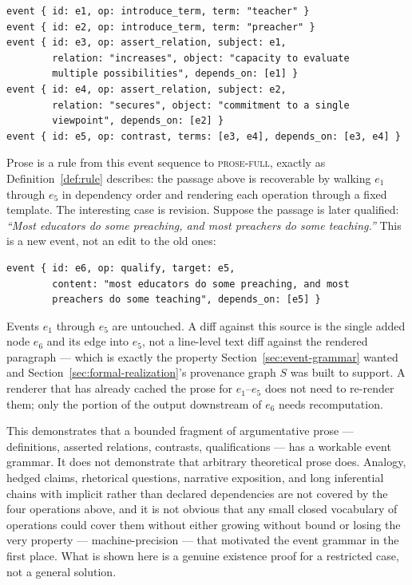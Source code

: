 \documentclass[11pt]{article}
\theoremstyle{definition}
\begin{document}
\begin{verbatim}
event { id: e1, op: introduce_term, term: "teacher" }
event { id: e2, op: introduce_term, term: "preacher" }
event { id: e3, op: assert_relation, subject: e1,
        relation: "increases", object: "capacity to evaluate
        multiple possibilities", depends_on: [e1] }
event { id: e4, op: assert_relation, subject: e2,
        relation: "secures", object: "commitment to a single
        viewpoint", depends_on: [e2] }
event { id: e5, op: contrast, terms: [e3, e4], depends_on: [e3, e4] }
\end{verbatim}

Prose is a rule from this event sequence to \textsc{prose-full}, exactly as Definition~\ref{def:rule} describes: the passage above is recoverable by walking $e_1$ through $e_5$ in dependency order and rendering each operation through a fixed template. The interesting case is revision. Suppose the passage is later qualified: \emph{``Most educators do some preaching, and most preachers do some teaching.''} This is a new event, not an edit to the old ones:

\begin{verbatim}
event { id: e6, op: qualify, target: e5,
        content: "most educators do some preaching, and most
        preachers do some teaching", depends_on: [e5] }
\end{verbatim}

Events $e_1$ through $e_5$ are untouched. A diff against this source is the single added node $e_6$ and its edge into $e_5$, not a line-level text diff against the rendered paragraph --- which is exactly the property Section~\ref{sec:event-grammar} wanted and Section~\ref{sec:formal-realization}'s provenance graph $S$ was built to support. A renderer that has already cached the prose for $e_1$--$e_5$ does not need to re-render them; only the portion of the output downstream of $e_6$ needs recomputation.

This demonstrates that a bounded fragment of argumentative prose --- definitions, asserted relations, contrasts, qualifications --- has a workable event grammar. It does not demonstrate that arbitrary theoretical prose does. Analogy, hedged claims, rhetorical questions, narrative exposition, and long inferential chains with implicit rather than declared dependencies are not covered by the four operations above, and it is not obvious that any small closed vocabulary of operations could cover them without either growing without bound or losing the very property --- machine-precision --- that motivated the event grammar in the first place. What is shown here is a genuine existence proof for a restricted case, not a general solution.
\end{document}
